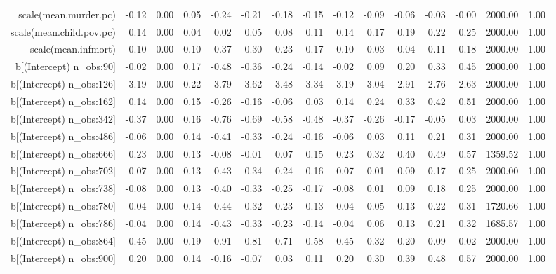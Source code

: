 \begin{table}[ht]
\begin{tabular}{rrrrrrrrrrrrrrr}
  scale(mean.murder.pc) & -0.12 & 0.00 & 0.05 & -0.24 & -0.21 & -0.18 & -0.15 & -0.12 & -0.09 & -0.06 & -0.03 & -0.00 & 2000.00 & 1.00 \\ 
  scale(mean.child.pov.pc) & 0.14 & 0.00 & 0.04 & 0.02 & 0.05 & 0.08 & 0.11 & 0.14 & 0.17 & 0.19 & 0.22 & 0.25 & 2000.00 & 1.00 \\ 
  scale(mean.infmort) & -0.10 & 0.00 & 0.10 & -0.37 & -0.30 & -0.23 & -0.17 & -0.10 & -0.03 & 0.04 & 0.11 & 0.18 & 2000.00 & 1.00 \\ 
  b[(Intercept) n\_obs:90] & -0.02 & 0.00 & 0.17 & -0.48 & -0.36 & -0.24 & -0.14 & -0.02 & 0.09 & 0.20 & 0.33 & 0.45 & 2000.00 & 1.00 \\ 
  b[(Intercept) n\_obs:126] & -3.19 & 0.00 & 0.22 & -3.79 & -3.62 & -3.48 & -3.34 & -3.19 & -3.04 & -2.91 & -2.76 & -2.63 & 2000.00 & 1.00 \\ 
  b[(Intercept) n\_obs:162] & 0.14 & 0.00 & 0.15 & -0.26 & -0.16 & -0.06 & 0.03 & 0.14 & 0.24 & 0.33 & 0.42 & 0.51 & 2000.00 & 1.00 \\ 
  b[(Intercept) n\_obs:342] & -0.37 & 0.00 & 0.16 & -0.76 & -0.69 & -0.58 & -0.48 & -0.37 & -0.26 & -0.17 & -0.05 & 0.03 & 2000.00 & 1.00 \\ 
  b[(Intercept) n\_obs:486] & -0.06 & 0.00 & 0.14 & -0.41 & -0.33 & -0.24 & -0.16 & -0.06 & 0.03 & 0.11 & 0.21 & 0.31 & 2000.00 & 1.00 \\ 
  b[(Intercept) n\_obs:666] & 0.23 & 0.00 & 0.13 & -0.08 & -0.01 & 0.07 & 0.15 & 0.23 & 0.32 & 0.40 & 0.49 & 0.57 & 1359.52 & 1.00 \\ 
  b[(Intercept) n\_obs:702] & -0.07 & 0.00 & 0.13 & -0.43 & -0.34 & -0.24 & -0.16 & -0.07 & 0.01 & 0.09 & 0.17 & 0.25 & 2000.00 & 1.00 \\ 
  b[(Intercept) n\_obs:738] & -0.08 & 0.00 & 0.13 & -0.40 & -0.33 & -0.25 & -0.17 & -0.08 & 0.01 & 0.09 & 0.18 & 0.25 & 2000.00 & 1.00 \\ 
  b[(Intercept) n\_obs:780] & -0.04 & 0.00 & 0.14 & -0.44 & -0.32 & -0.23 & -0.13 & -0.04 & 0.05 & 0.13 & 0.22 & 0.31 & 1720.66 & 1.00 \\ 
  b[(Intercept) n\_obs:786] & -0.04 & 0.00 & 0.14 & -0.43 & -0.33 & -0.23 & -0.14 & -0.04 & 0.06 & 0.13 & 0.21 & 0.32 & 1685.57 & 1.00 \\ 
  b[(Intercept) n\_obs:864] & -0.45 & 0.00 & 0.19 & -0.91 & -0.81 & -0.71 & -0.58 & -0.45 & -0.32 & -0.20 & -0.09 & 0.02 & 2000.00 & 1.00 \\ 
  b[(Intercept) n\_obs:900] & 0.20 & 0.00 & 0.14 & -0.16 & -0.07 & 0.03 & 0.11 & 0.20 & 0.30 & 0.39 & 0.48 & 0.57 & 2000.00 & 1.00 \\ 

\end{tabular}
\end{table}
